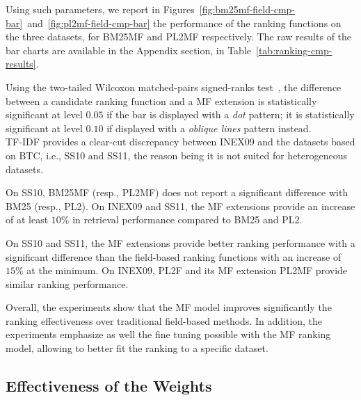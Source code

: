 

Using such parameters, we report in Figures~\ref{fig:bm25mf-field-cmp-bar}~and~\ref{fig:pl2mf-field-cmp-bar} the performance of the ranking functions on the three datasets, for \gls{BM25MF} and \gls{PL2MF} respectively. The raw results of the bar charts are available in the Appendix section, in Table~\ref{tab:ranking-cmp-results}.

Using the two-tailed Wilcoxon matched-pairs signed-ranks test~\cite{sheskin:2003:CRC,buttcher:2010:IRI:1869919}, the difference between a candidate ranking function and a \gls{MF} extension is statistically significant at level $0.05$ if the bar is displayed with a \textit{dot} pattern; it is statistically significant at level $0.10$ if displayed with a \emph{oblique lines} pattern instead.\\

TF-IDF provides a clear-cut discrepancy between INEX09 and the datasets based on BTC, i.e., SS10 and SS11, the reason being it is not suited for heterogeneous datasets.

On SS10, \gls{BM25MF} (resp., \gls{PL2MF}) does not report a significant difference with BM25 (resp., PL2). On INEX09 and SS11, the \gls{MF} extensions provide an increase of at least $10\%$ in retrieval performance compared to BM25 and PL2.

On SS10 and SS11, the \gls{MF} extensions provide better ranking performance with a significant difference than the field-based ranking functions with an increase of $15\%$ at the minimum. On INEX09, PL2F and its \gls{MF} extension \gls{PL2MF} provide similar ranking performance.

Overall, the experiments show that the \gls{MF} model improves significantly the ranking effectiveness over traditional field-based methods. In addition, the experiments emphasize as well the fine tuning possible with the \gls{MF} ranking model, allowing to better fit the ranking to a specific dataset.



\subsection{Effectiveness of the Weights}
\label{sec:weights-effectiveness}

